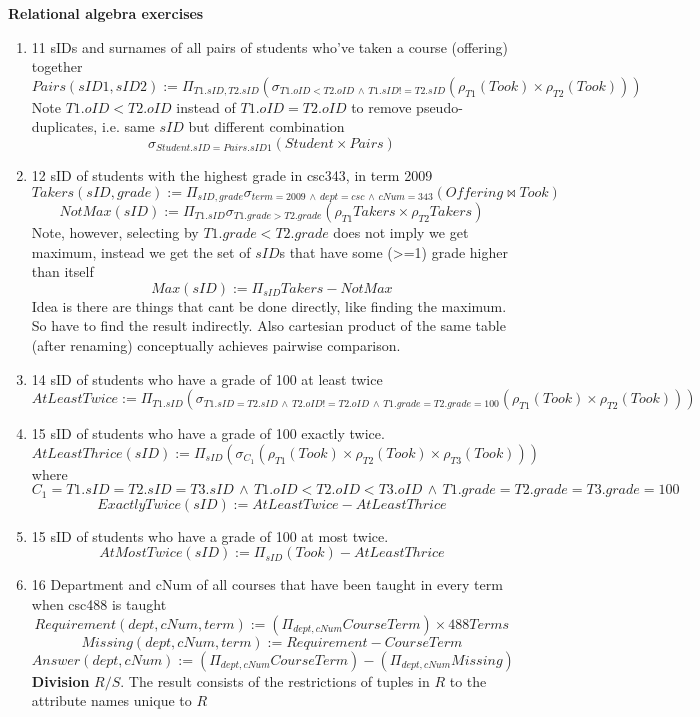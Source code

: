 \documentclass[11pt]{article}
\begin{document}
\begin{defn*}
    \textbf{Relational algebra exercises}
    \begin{enumerate}
        \item 11 sIDs and surnames of all pairs of students who've taken a course (offering) together 
        \[
            Pairs(sID1, sID2) := \Pi_{T1.sID, T2.sID} (\sigma_{T1.oID<T2.oID \, \land \, T1.sID!=T2.sID} (\rho_{T1} (Took) \times \rho_{T2} (Took)))
        \]
        Note $T1.oID < T2.oID$ instead of $T1.oID = T2.oID$ to remove pseudo-duplicates, i.e. same $sID$ but different combination
        \[
            \sigma_{Student.sID=Pairs.sID1} (Student \times Pairs)
        \]
        \item 12 sID of students with the highest grade in csc343, in term 2009
        \[
            Takers(sID, grade) := \Pi_{sID, grade} \sigma_{term=2009 \, \land \, dept=csc \, \land \, cNum=343} (Offering \bowtie Took)
        \]
        \[
            NotMax(sID) := \Pi_{T1.sID} \sigma_{T1.grade > T2.grade} (\rho_{T1} Takers \times \rho_{T2} Takers)
        \]
        Note, however, selecting by $T1.grade < T2.grade$ does not imply we get maximum, instead we get the set of $sID$s that have some (>=1) grade higher than itself
        \[
            Max(sID) := \Pi_{sID} Takers - NotMax
        \]
        Idea is there are things that cant be done directly, like finding the maximum. So have to find the result indirectly. Also cartesian product of the same table (after renaming) conceptually achieves pairwise comparison.
        \item 14 sID of students who have a grade of 100 at least twice
        \[
            AtLeastTwice := \Pi_{T1.sID} ( \sigma_{T1.sID=T2.sID \,\land\, T2.oID!=T2.oID \,\land\, T1.grade=T2.grade=100} ( \rho_{T1}(Took) \times \rho_{T2}(Took)))
        \]
        \item 15 sID of students who have a grade of 100 exactly twice. 
        \[
            AtLeastThrice(sID) := \Pi_{sID} (\sigma_{C_1} (\rho_{T1}(Took) \times \rho_{T2}(Took) \times \rho_{T3} (Took)))
        \]
        where 
        \[
            C_1 = T1.sID = T2.sID = T3.sID \,\land\, T1.oID < T2.oID < T3.oID \,\land\, T1.grade=T2.grade=T3.grade=100
        \]
        \[
            ExactlyTwice(sID) := AtLeastTwice - AtLeastThrice
        \]
        \item 15 sID of students who have a grade of 100 at most twice. 
        \[
            AtMostTwice(sID ) := \Pi_{sID} (Took) - AtLeastThrice
        \]
        \item 16 Department and cNum of all courses that have been taught in every term when csc488 is taught
        \[
            Requirement(dept, cNum, term) := (\Pi_{dept, cNum} CourseTerm) \times 488Terms
        \]
        \[
            Missing(dept, cNum, term) := Requirement - CourseTerm
        \]
        \[
            Answer(dept, cNum) := (\Pi_{dept, cNum} CourseTerm) - (\Pi_{dept, cNum} Missing)
        \]
        \textbf{Division}  $R / S$. The result consists of the restrictions of tuples in $R$ to the attribute names unique to $R$
    \end{enumerate}
\end{defn*}
\end{document}
